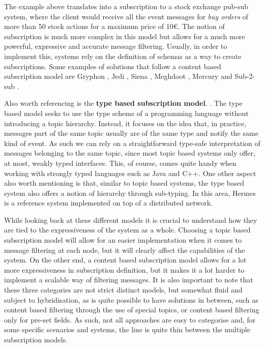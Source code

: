 The example above translates into a subscription to a stock exchange
pub-sub system, where the client would receive all the event messages
for \emph{buy orders} of more than 50 stock actions for a maximum price of
10\euro. The notion of subscription is much more complex in this
model but allows for a much more powerful, expressive and accurate
message filtering. Usually, in order to implement this, systems rely on
the definition of schemas as a way to create subscriptions. Some
examples of solutions that follow a content based subscription model are
Gryphon \cite{Strom1998}, Jedi \cite{Cugola2001}, Siena \cite{Carzaniga2003},
Meghdoot \cite{Gupta2004}, Mercury \cite{Bharambe2002} and Sub-2-sub \cite{Voulgaris2005}.
\bigskip

Also worth referencing is the \textbf{type based subscription model}.
\cite{Eugster2000}. The type based model seeks to use the type
scheme of a programming language without introducing a topic hierarchy.
Instead, it focuses on the idea that, in practice, messages part of the
same topic usually are of the same type and notify the same kind of
event. As such we can rely on a straightforward type-safe interpretation
of messages belonging to the same topic, since most topic based systems
only offer, at most, weakly typed interfaces. This, of course, comes
quite handy when working with strongly typed languages such as Java and
C++. One other aspect also worth mentioning is that, similar to topic
based systems, the type based system also offers a notion of hierarchy
through sub-typing. In this area, Hermes \cite{Pietzuch2002} is a
reference system implemented on top of a distributed network.

While looking back at these different models it is crucial to understand
how they are tied to the expressiveness of the system as a whole.
Choosing a topic based subscription model will allow for an easier
implementation when it comes to message filtering at each node, but it
will clearly affect the capabilities of the system. On the other end, a
content based subscription model allows for a lot more expressiveness in
subscription definition, but it makes it a lot harder to implement a
scalable way of filtering messages. It is also important to note that
these three categories are not strict distinct models, but somewhat
fluid and subject to hybridisation, as is quite possible to have
solutions in between, such as content based filtering through the use of
special topics, or content based filtering only for pre-set fields. As
such, not all approaches are easy to categorise and, for some specific
scenarios and systems, the line is quite thin between the multiple
subscription models.

